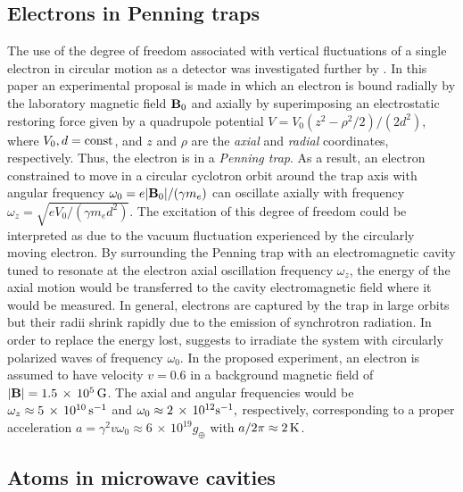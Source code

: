 \documentclass[12pt,nofootinbib,floatfix,aps,prd,showpacs,amsmath,amssymb,eqsecnum]{revtex4-2}
\let\cite\citep
\begin{document}
\subsection{Electrons in Penning traps}
\label{subsection:penningtrap}

The use of the degree of freedom associated with vertical fluctuations 
of a single electron in circular motion as a detector was investigated 
further by \textcite{Rogers88}. In this paper an experimental proposal
is made in which an electron
is bound radially by the laboratory magnetic field ${\bf B}_0$ 
and axially by superimposing an electrostatic restoring force given 
by a quadrupole  potential 
\cite{Brownetal86}
$ 
V = V_0 {(z^2 - \rho^2/2)}/(2 d^2)
$,
where $V_0, d = {\rm const}$, and  $z$ and $\rho$ are the {\em axial} and
{\em radial} coordinates, respectively. Thus, the electron is in a
{\em Penning trap}. As a result, an electron constrained 
to move in a circular cyclotron orbit around the trap axis with angular 
frequency $\omega_0 = e|{\bf B}_0| / (\gamma m_e)$ can oscillate axially 
with frequency
$
\omega_z = \sqrt{e V_0/ ( \gamma m_e d^2)}
$.
The excitation of this degree of freedom could be interpreted as due to 
the vacuum fluctuation experienced by the circularly moving electron. By
surrounding the Penning trap with an electromagnetic cavity tuned to 
resonate at the electron axial oscillation frequency $\omega_z$, the 
energy of the axial motion would be transferred to the cavity 
electromagnetic field where it would be measured.
In general, electrons are captured by the trap in large orbits but their 
radii shrink rapidly due to 
the emission of synchrotron radiation. In order
to replace the energy lost, \textcite{Rogers88} suggests to
irradiate the system with circularly polarized waves of frequency 
$\omega_0$. In the proposed experiment,
an electron is assumed to have 
velocity $v=0.6$ in a background magnetic field of 
$|{\bf B}| = 1.5\, \times \, 10^{5} \,  {\rm G}$. The axial and angular 
frequencies would be 
$
\omega_z \approx 5 \, \times \, 10^{10} \, {\rm s}^{-1}
$
and
$
\omega_0 \approx 2 \, \times \, 10^{12} {\rm s}^{-1},
$
respectively, corresponding to a proper acceleration 
$a = \gamma^2 v \omega_0 \approx 6 \, \times \, 10^{19} g_\oplus$
with $a/2\pi \approx 2\,{\rm K}$.

\subsection{Atoms in microwave cavities}
\label{subsection:cavities}
\end{document}
